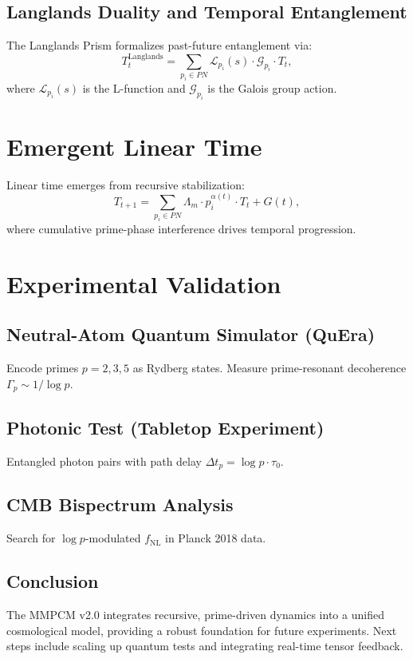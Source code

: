 \documentclass[11pt]{article}
\begin{document}
\subsection{Langlands Duality and Temporal Entanglement}
The Langlands Prism formalizes past-future entanglement via:
\begin{equation}
T_t^{\text{Langlands}} = \sum_{p_i \in PN} \mathcal{L}_{p_i}(s) \cdot \mathcal{G}_{p_i} \cdot T_t,
\end{equation}
where \(\mathcal{L}_{p_i}(s)\) is the L-function and \(\mathcal{G}_{p_i}\) is the Galois group action.

\section{Emergent Linear Time}
Linear time emerges from recursive stabilization:
\begin{equation}
T_{t+1} = \sum_{p_i \in PN} \Lambda_m \cdot p_i^{\alpha(t)} \cdot T_t + G(t),
\end{equation}
where cumulative prime-phase interference drives temporal progression.

\section{Experimental Validation}
\subsection{Neutral-Atom Quantum Simulator (QuEra)}
Encode primes \(p=2,3,5\) as Rydberg states. Measure prime-resonant decoherence \(\Gamma_p \sim 1/\log p\).

\subsection{Photonic Test (Tabletop Experiment)}
Entangled photon pairs with path delay \(\Delta t_p = \log p \cdot \tau_0\).

\subsection{CMB Bispectrum Analysis}
Search for \(\log p\)-modulated \(f_{\text{NL}}\) in Planck 2018 data.

\subsection{Conclusion}
The MMPCM v2.0 integrates recursive, prime-driven dynamics into a unified cosmological model, providing a robust foundation for future experiments. Next steps include scaling up quantum tests and integrating real-time tensor feedback.
\end{document}
